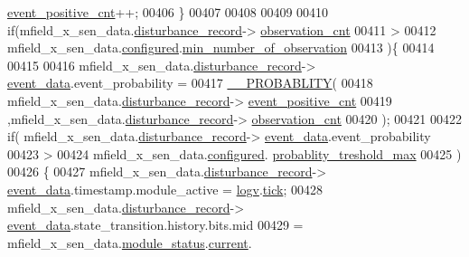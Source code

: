 \begin{DoxyCode}
      \hyperlink{a00028_a7397b9d76d4b57500f27bb23d258a18a}{event\_positive\_cnt}++;
00406            \}
00407 
00408 
00409 
00410                \textcolor{keywordflow}{if}(mfield\_x\_sen\_data.\hyperlink{a00025_ac9b38e2c1d3f1013a88d33506c754152}{disturbance\_record}->
      \hyperlink{a00028_ad5b0bac02ce266b91b2b52a1c3ea1d78}{observation\_cnt}
00411                 >
00412                 mfield\_x\_sen\_data.\hyperlink{a00025_a94b2d1f6ea4ab334c74d24984dd27843}{configured}.\hyperlink{a00021_ae8665e8bf422c1482442d6949ba28408}{min\_number\_of\_observation}
00413                )\{
00414 
00415 
00416                     mfield\_x\_sen\_data.\hyperlink{a00025_ac9b38e2c1d3f1013a88d33506c754152}{disturbance\_record}->
      \hyperlink{a00028_a8c0bda69e71ef674e60da47ad0be9ab0}{event\_data}.event\_probability =
00417                            \hyperlink{a00021_ab2185512402ea26115af112ce48175b2}{\_\_PROBABLITY}(
00418                            mfield\_x\_sen\_data.\hyperlink{a00025_ac9b38e2c1d3f1013a88d33506c754152}{disturbance\_record}->
      \hyperlink{a00028_a7397b9d76d4b57500f27bb23d258a18a}{event\_positive\_cnt}
00419                           ,mfield\_x\_sen\_data.\hyperlink{a00025_ac9b38e2c1d3f1013a88d33506c754152}{disturbance\_record}->
      \hyperlink{a00028_ad5b0bac02ce266b91b2b52a1c3ea1d78}{observation\_cnt}
00420                            );
00421 
00422                    \textcolor{keywordflow}{if}( mfield\_x\_sen\_data.\hyperlink{a00025_ac9b38e2c1d3f1013a88d33506c754152}{disturbance\_record}->
      \hyperlink{a00028_a8c0bda69e71ef674e60da47ad0be9ab0}{event\_data}.event\_probability
00423                         >
00424                        mfield\_x\_sen\_data.\hyperlink{a00025_a94b2d1f6ea4ab334c74d24984dd27843}{configured}.
      \hyperlink{a00021_a7e2d217b9c9051d361319180a426851c}{probablity\_treshold\_max}
00425                      )
00426                    \{
00427                          mfield\_x\_sen\_data.\hyperlink{a00025_ac9b38e2c1d3f1013a88d33506c754152}{disturbance\_record}->
      \hyperlink{a00028_a8c0bda69e71ef674e60da47ad0be9ab0}{event\_data}.timestamp.module\_active = \hyperlink{a00021_a2e89c46668b39a17753c238950c9e1ec}{logv}.\hyperlink{a00021_a81f0ce68c2c483fb8df726cc1988d8e8}{tick};
00428                          mfield\_x\_sen\_data.\hyperlink{a00025_ac9b38e2c1d3f1013a88d33506c754152}{disturbance\_record}->
      \hyperlink{a00028_a8c0bda69e71ef674e60da47ad0be9ab0}{event\_data}.state\_transition.history.bits.mid
00429                          = mfield\_x\_sen\_data.\hyperlink{a00025_adfab5a5d8b45a93dfb13edb24e2b80e3}{module\_status}.\hyperlink{a00019_acf41ffc11da291c2f9f0fcb02ee72b98}{current}.

\end{DoxyCode}
